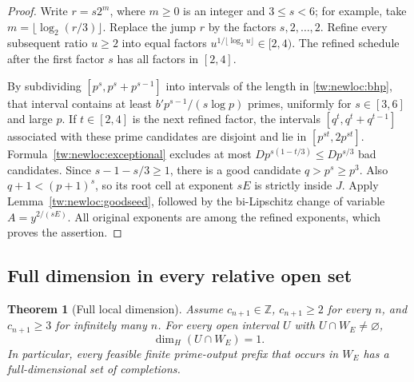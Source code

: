 \documentclass[11pt,a4paper]{article}
\newtheorem{theorem}{Theorem}[section]
\theoremstyle{definition}
\theoremstyle{remark}
\numberwithin{equation}{section}
\begin{document}
\begin{proof}
Write $r=s2^m$, where $m\ge0$ is an integer and $3\le s<6$; for example,
take $m=\lfloor\log_2(r/3)\rfloor$. Replace the jump $r$ by the factors
$s,2,\ldots,2$. Refine every subsequent ratio $u\ge2$ into equal factors
$u^{1/\lfloor\log_2u\rfloor}\in[2,4)$. The refined schedule after the
first factor $s$ has all factors in $[2,4]$.

By subdividing $[p^s,p^s+p^{s-1}]$ into intervals of the length in
\eqref{tw:newloc:bhp}, that interval contains at least
$b' p^{s-1}/(s\log p)$ primes, uniformly for $s\in[3,6]$ and large $p$.
If $t\in[2,4]$ is the next refined factor, the intervals
$[q^t,q^t+q^{t-1}]$ associated with these prime candidates are disjoint
and lie in $[p^{st},2p^{st}]$. Formula~\eqref{tw:newloc:exceptional} excludes
at most $Dp^{s(1-t/3)}\le Dp^{s/3}$ bad candidates.
Since $s-1-s/3\ge1$, there is a good candidate $q>p^s\ge p^3$.
Also $q+1<(p+1)^s$, so its root cell at exponent $sE$ is strictly inside
$J$. Apply Lemma~\ref{tw:newloc:goodseed}, followed by the bi-Lipschitz
change of variable $A=y^{2/(sE)}$. All original exponents are among the
refined exponents, which proves the assertion.
\end{proof}

\subsection{Full dimension in every relative open set}

\begin{theorem}[Full local dimension]\label{tw:newloc:fulllocal}
Assume $c_{n+1}\in\mathbb Z$, $c_{n+1}\ge2$ for every $n$, and
$c_{n+1}\ge3$ for infinitely many $n$. For every open interval $U$ with
$U\cap W_E\ne\varnothing$,
\[
 \boxed{\dim_H(U\cap W_E)=1.}
\]
In particular, every feasible finite prime-output prefix that occurs in
$W_E$ has a full-dimensional set of completions.
\end{theorem}
\end{document}
